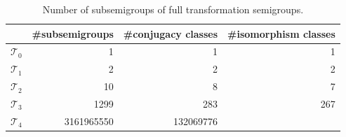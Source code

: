 \documentclass{amsart}
\newcommand{\cT}{{\mathcal T}}
\theoremstyle{plain}
\theoremstyle{definition}
\begin{document}
\begin{table}
\renewcommand{\arraystretch}{1}
\begin{tabular}{|c|r|r|r|}
\hline
 & \#subsemigroups & \#conjugacy classes & \#isomorphism classes \\
\hline
$\cT_0$ & 1  & 1 & 1\\
\hline
$\cT_1$ & 2  & 2 & 2\\
\hline
$\cT_2$ & 10  & 8 & 7\\
\hline
$\cT_3$ & 1299 & 283 & 267\\
\hline
$\cT_4$ & 3161965550 & 132069776 & \\
\hline
\end{tabular}
\caption{Number of subsemigroups of full transformation semigroups.}
\end{table}




\end{document}
